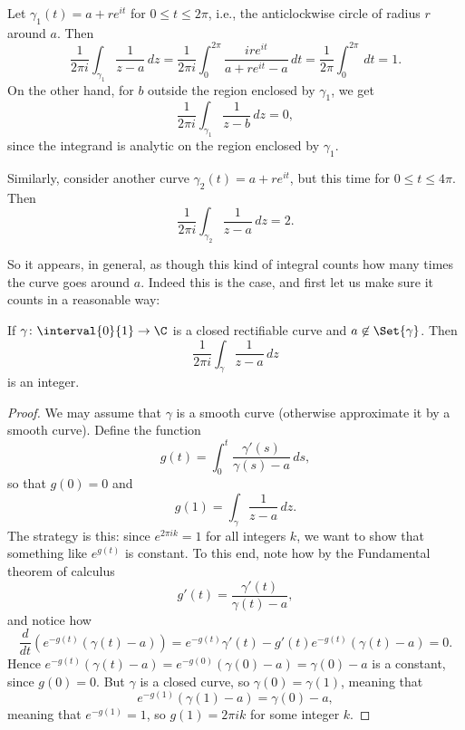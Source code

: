 


Let $\gamma_1(t) = a + r e^{i t}$ for $0 \leq t \leq 2 \pi$, i.e., the anticlockwise circle of radius $r$ around $a$.
Then
\[
	\frac{1}{2 \pi i} \int_{\gamma_1} \frac{1}{z - a} \, d z = \frac{1}{2 \pi i} \int_0^{2 \pi} \frac{i r e^{i t}}{a + r e^{i t} - a} \, d t = \frac{1}{2 \pi} \int_0^{2 \pi} \, d t = 1.
\]
On the other hand, for $b$ outside the region enclosed by $\gamma_1$, we get
\[
	\frac{1}{2 \pi i} \int_{\gamma_1} \frac{1}{z - b} \, d z = 0,
\]
since the integrand is analytic on the region enclosed by $\gamma_1$.

Similarly, consider another curve $\gamma_2(t) = a + r e^{i t}$, but this time for $0 \leq t \leq 4 \pi$.
Then
\[
	\frac{1}{2 \pi i} \int_{\gamma_2} \frac{1}{z - a} \, d z = 2.
\]

So it appears, in general, as though this kind of integral counts how many times the curve goes around $a$.
Indeed this is the case, and first let us make sure it counts in a reasonable way:

\begin{proposition}\label{prop4.1}
	If $\gamma \colon \interval{0}{1} \to \C$ is a closed rectifiable curve and $a \not\in \Set{\gamma}$.
	Then
	\[
		\frac{1}{2 \pi i} \int_\gamma \frac{1}{z - a} \, d z
	\]
	is an integer.
\end{proposition}

\begin{proof}
	We may assume that $\gamma$ is a smooth curve (otherwise approximate it by a smooth curve).
	Define the function
	\[
		g(t) = \int_0^t \frac{\gamma'(s)}{\gamma(s) - a} \, d s,
	\]
	so that $g(0) = 0$ and
	\[
		g(1) = \int_\gamma \frac{1}{z - a} \, d z.
	\]
	The strategy is this: since $e^{2 \pi i k} = 1$ for all integers $k$, we want to show that something like $e^{g(t)}$ is constant.
	To this end, note how by the Fundamental theorem of calculus
	\[
		g'(t) = \frac{\gamma'(t)}{\gamma(t) - a},
	\]
	and notice how
	\[
		\frac{d}{d t} \left ( e^{-g(t)} (\gamma(t) - a) \right ) = e^{-g(t)} \gamma'(t) - g'(t) e^{-g(t)} (\gamma(t) - a) = 0.
	\]
	Hence $e^{-g(t)} (\gamma(t) -a) = e^{-g(0)} (\gamma(0) - a) = \gamma(0) - a$ is a constant, since $g(0) = 0$.
	But $\gamma$ is a closed curve, so $\gamma(0) = \gamma(1)$, meaning that
	\[
		e^{-g(1)} (\gamma(1) - a) = \gamma(0) - a,
	\]
	meaning that $e^{-g(1)} = 1$, so $g(1) = 2 \pi i k$ for some integer $k$.
\end{proof}

